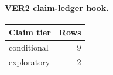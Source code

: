 \paragraph{VER2 claim-ledger hook.}
\begin{center}
\begin{tabular}{lr}
\hline
Claim tier & Rows \\
\hline
conditional & 9 \\
exploratory & 2 \\
\hline
\end{tabular}
\end{center}
